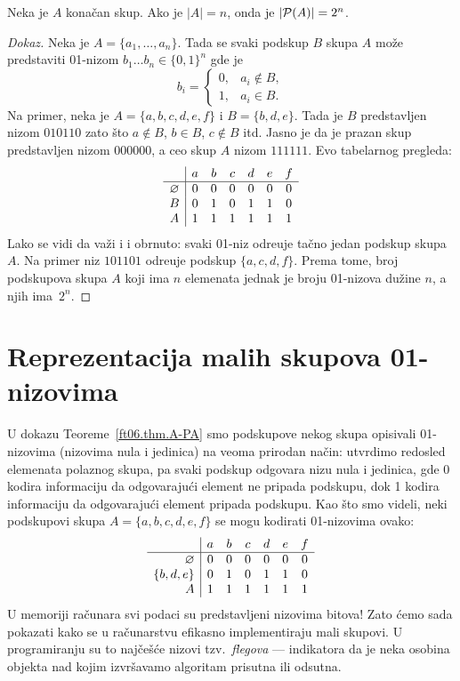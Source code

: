 \begin{THM}\label{ft06.thm.A-PA}
  Neka je $A$ kona\v can skup. Ako je $|A| = n$, onda je $|\mathcal{P}(A)| = 2^n$.
\end{THM}
\begin{proof}[Dokaz]
  Neka je $A = \{a_1, \ldots, a_n\}$. Tada se svaki podskup $B$ skupa $A$
  mo\v ze predstaviti 01-nizom $b_1 \ldots b_n \in \{0, 1\}^n$
  gde je
  $$
    b_i = \begin{cases}
      0, & a_i \notin B,\\
      1, & a_i \in B.
    \end{cases}
  $$
  Na primer, neka je $A = \{a, b, c, d, e, f\}$ i $B = \{b, d, e\}$. Tada je $B$ predstavljen nizom $010110$
  zato \v sto $a \notin B$, $b \in B$, $c \notin B$ itd. Jasno je da je prazan skup predstavljen nizom $000000$,
  a ceo skup $A$ nizom $111111$. Evo tabelarnog pregleda:
  $$
    \begin{array}{c|cccccc}
        & a & b & c & d & e & f \\ \hline
     \varnothing & 0 & 0 & 0 & 0 & 0 & 0 \\
      B & 0 & 1 & 0 & 1 & 1 & 0 \\
      A & 1 & 1 & 1 & 1 & 1 & 1
    \end{array}
  $$
  Lako se vidi da va\v zi i i obrnuto: svaki 01-niz odre\dj uje ta\v cno jedan podskup skupa $A$. Na primer
  niz $101101$ odre\dj uje podskup $\{a, c, d, f\}$.
  Prema tome, broj podskupova skupa $A$ koji ima $n$ elemenata jednak je broju 01-nizova du\v zine $n$, a njih ima~$2^n$.
\end{proof}

\section{Reprezentacija malih skupova 01-nizovima}

U dokazu Teoreme~\ref{ft06.thm.A-PA} smo podskupove nekog skupa opisivali 01-nizovima (nizovima nula i jedinica)
na veoma prirodan na\v cin: utvrdimo redosled elemenata polaznog skupa, pa svaki podskup odgovara nizu nula i jedinica,
gde 0 kodira informaciju da odgovaraju\'ci element ne pripada podskupu, dok 1 kodira informaciju da odgovaraju\'ci element pripada podskupu.
Kao \v sto smo videli, neki podskupovi skupa $A = \{a, b, c, d, e, f\}$ se mogu kodirati 01-nizovima ovako:
$$
  \begin{array}{r|cccccc}
                & a & b & c & d & e & f \\ \hline
   \varnothing           & 0 & 0 & 0 & 0 & 0 & 0 \\
    {\{b, d, e\}} & 0 & 1 & 0 & 1 & 1 & 0 \\
    A           & 1 & 1 & 1 & 1 & 1 & 1
  \end{array}
$$
U memoriji ra\v cunara svi podaci su predstavljeni nizovima bitova! Zato \'cemo sada pokazati kako se u ra\v cunarstvu
efikasno implementiraju mali skupovi. U programiranju su to naj\v ce\v s\'ce nizovi tzv.\ \emph{flegova} --- indikatora da je neka
osobina objekta nad kojim izvr\v savamo algoritam prisutna ili odsutna.


